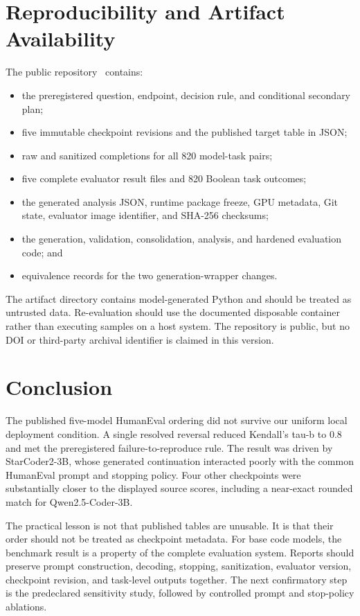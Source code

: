 \documentclass[10pt,twocolumn]{article}
\begin{document}
\section{Reproducibility and Artifact Availability}

The public repository~\citep{bassi2026repository} contains:

\begin{itemize}
  \item the preregistered question, endpoint, decision rule, and conditional secondary plan;
  \item five immutable checkpoint revisions and the published target table in JSON;
  \item raw and sanitized completions for all 820 model-task pairs;
  \item five complete evaluator result files and 820 Boolean task outcomes;
  \item the generated analysis JSON, runtime package freeze, GPU metadata, Git state, evaluator image identifier, and SHA-256 checksums;
  \item the generation, validation, consolidation, analysis, and hardened evaluation code; and
  \item equivalence records for the two generation-wrapper changes.
\end{itemize}

The artifact directory contains model-generated Python and should be treated as untrusted data. Re-evaluation should use the documented disposable container rather than executing samples on a host system. The repository is public, but no DOI or third-party archival identifier is claimed in this version.

\section{Conclusion}

The published five-model HumanEval ordering did not survive our uniform local deployment condition. A single resolved reversal reduced Kendall's tau-b to 0.8 and met the preregistered failure-to-reproduce rule. The result was driven by StarCoder2-3B, whose generated continuation interacted poorly with the common HumanEval prompt and stopping policy. Four other checkpoints were substantially closer to the displayed source scores, including a near-exact rounded match for Qwen2.5-Coder-3B.

The practical lesson is not that published tables are unusable. It is that their order should not be treated as checkpoint metadata. For base code models, the benchmark result is a property of the complete evaluation system. Reports should preserve prompt construction, decoding, stopping, sanitization, evaluator version, checkpoint revision, and task-level outputs together. The next confirmatory step is the predeclared sensitivity study, followed by controlled prompt and stop-policy ablations.

\clearpage
\balance


\end{document}
